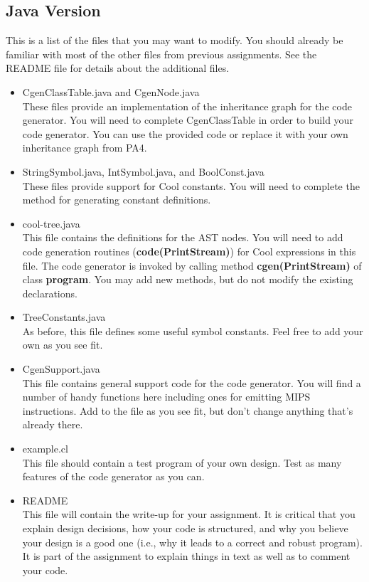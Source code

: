 \documentclass[11pt]{article}
\def\U#1{{\sf{}#1}}
\def\C#1{{\bf{}#1}}
\begin{document}
\subsection{Java Version}

This is a list of the files that you may want to modify.
You should already be familiar with most of the other files from previous assignments.
See the \U{README} file for details about the additional
files.

\begin{itemize}

\item \U{CgenClassTable.java} and \U{CgenNode.java} \\
These files provide an implementation of the inheritance graph for the
code generator.  You will need to complete CgenClassTable in order to
build your code generator. You can use the provided code or replace it
with your own inheritance graph from PA4.

\item \U{StringSymbol.java}, \U{IntSymbol.java}, and \U{BoolConst.java} \\
These files provide support for Cool constants.  You
will need to complete the method for generating constant definitions.

\item \U{cool-tree.java} \\
This file contains the definitions for the AST nodes.  You will need
to add code generation routines (\C{code(PrintStream)}) for Cool
expressions in this file.  The code generator is invoked by calling
method \C{cgen(PrintStream)} of class \C{program}. You may add new
methods, but do not modify the existing declarations.

\item \U{TreeConstants.java} \\
As before, this file defines some useful symbol constants. Feel free to
add your own as you see fit.

\item \U{CgenSupport.java} \\
This file contains general support code for the code generator.  You
will find a number of handy functions here including ones for emitting
MIPS instructions.  Add to the file as you see fit, but don't change
anything that's already there.

\item \U{example.cl} \\
This file should contain a test program of your own design.  
Test as many features of the code generator as you can.


\item \U{README} \\
This file will contain the write-up for your assignment. 
It is critical that you explain design decisions, how your
code is structured, and why you believe your design is a good one
(i.e., why it leads to a correct and robust program).  It is part of
the assignment to explain things in text as well as to comment your
code. 

\end{itemize}
\end{document}
